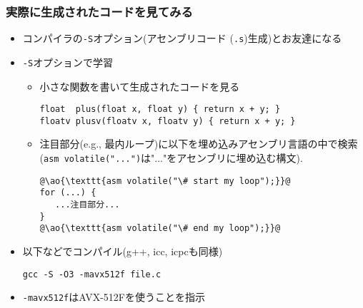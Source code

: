 \documentclass[10pt,dvipdfmx]{beamer}
\newcommand{\ao}[1]{{\color{blue}#1}}
\begin{document}
\begin{frame}[fragile]
  \frametitle{実際に生成されたコードを見てみる}
  \begin{itemize}
  \item コンパイラの\ao{\texttt{-S}}オプション(アセンブリコード
    (\ao{\texttt{.s}})生成)とお友達になる
  \item \texttt{-S}オプションで学習
    \begin{itemize}
    \item 小さな関数を書いて生成されたコードを見る
\begin{lstlisting}
float  plus(float x, float y) { return x + y; }
floatv plusv(floatv x, floatv y) { return x + y; }
\end{lstlisting}
    \item 注目部分(e.g., 最内ループ)に以下を埋め込みアセンブリ言語の中で検索
  (\texttt{asm volatile("...")}は"..."をアセンブリに埋め込む構文).
\begin{lstlisting}
@\ao{\texttt{asm volatile("\# start my loop");}}@
for (...) {
   ...注目部分...
}
@\ao{\texttt{asm volatile("\# end my loop");}}@
\end{lstlisting}
\end{itemize}
\item 以下などでコンパイル(g++, icc, icpcも同様)
\begin{lstlisting}
gcc -S -O3 -mavx512f file.c
\end{lstlisting}
\item \texttt{-mavx512f}はAVX-512Fを使うことを指示
\end{itemize}
\end{frame}

\iffalse
\begin{frame}[fragile]
\frametitle{スカラ型データからベクトル型データを作る方法あれこれ(1)}
\begin{enumerate}
\item 変数宣言時の初期化子
\begin{lstlisting}
floatv v = @\ao{\texttt\{}@ 0,10,20,30,40,50,60,70 @\ao{\texttt\}}@;
\end{lstlisting}

\item 8要素を明示的に指定する関数
\begin{lstlisting}
floatv v = @\ao{\texttt{\_mm256\_set\_ps}}(0,10,20,30,40,50,60,70);
/* これで v = {0,10,20,30,40,50,60,70} */
\end{lstlisting}
方法1と異なり初期化以外の場所でも使える.

\item スカラ一個から全要素同一のベクトルを作る
\begin{lstlisting}
floatv v = @\ao{\texttt{\_mm256\_set1\_ps}}(30);
/* これで v = {30,30,30,30,30,...} */
\end{lstlisting}
\end{enumerate}
\end{frame}
\fi
\end{document}
